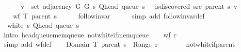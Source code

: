 \begin{isabellebody}
\ \ \ \ \ \ v\ {\isasymin}\ set\ {\isacharparenleft}{\kern0pt}adjacency\ G{}\ G{}\ s\ {\isacharparenleft}{\kern0pt}Q{\isacharunderscore}{\kern0pt}head\ {\isacharparenleft}{\kern0pt}queue\ s{\isacharparenright}{\kern0pt}{\isacharparenright}{\kern0pt}{\isacharparenright}{\kern0pt}\ {\isasymand}\ {\isasymnot}\ is{\isacharunderscore}{\kern0pt}discovered\ src\ {\isacharparenleft}{\kern0pt}parent\ s{\isacharparenright}{\kern0pt}\ v{\isacharbraceright}{\kern0pt}{\isachardoublequoteclose}\isanewline
\ \ \isamarkupfalse%
\ {\isachardoublequoteopen}wf\ {\isacharparenleft}{\kern0pt}T\ {\isacharparenleft}{\kern0pt}parent\ s{\isacharparenright}{\kern0pt}{\isacharparenright}{\kern0pt}{\isachardoublequoteclose}\isanewline
\ \ \ \ \isamarkupfalse%
\ follow{\isacharunderscore}{\kern0pt}invar\isanewline
\ \ \ \ \isamarkupfalse%
\ {\isacharparenleft}{\kern0pt}simp\ add{\isacharcolon}{\kern0pt}\ follow{\isacharunderscore}{\kern0pt}invar{\isacharunderscore}{\kern0pt}def{\isacharparenright}{\kern0pt}\isanewline
\ \ \isamarkupfalse%
\ {\isachardoublequoteopen}{\isasymnot}\ white\ s\ {\isacharparenleft}{\kern0pt}Q{\isacharunderscore}{\kern0pt}head\ {\isacharparenleft}{\kern0pt}queue\ s{\isacharparenright}{\kern0pt}{\isacharparenright}{\kern0pt}{\isachardoublequoteclose}\isanewline
\ \ \ \ \isamarkupfalse%
\ {\isacharparenleft}{\kern0pt}intro\ head{\isacharunderscore}{\kern0pt}queue{\isacharunderscore}{\kern0pt}mem{\isacharunderscore}{\kern0pt}queue\ not{\isacharunderscore}{\kern0pt}white{\isacharunderscore}{\kern0pt}if{\isacharunderscore}{\kern0pt}mem{\isacharunderscore}{\kern0pt}queue{\isacharparenright}{\kern0pt}\isanewline
\ \ \isamarkupfalse%
\ {\isachardoublequoteopen}wf\ {\isacharquery}{\kern0pt}r{\isachardoublequoteclose}\isanewline
\ \ \ \ \isamarkupfalse%
\ {\isacharparenleft}{\kern0pt}simp\ add{\isacharcolon}{\kern0pt}\ wf{\isacharunderscore}{\kern0pt}def{\isacharparenright}{\kern0pt}\isanewline
\ \ \isamarkupfalse%
\ {\isachardoublequoteopen}Domain\ {\isacharparenleft}{\kern0pt}T\ {\isacharparenleft}{\kern0pt}parent\ s{\isacharparenright}{\kern0pt}{\isacharparenright}{\kern0pt}\ {\isasyminter}\ Range\ {\isacharquery}{\kern0pt}r\ {\isacharequal}{\kern0pt}\ {\isacharbraceleft}{\kern0pt}{\isacharbraceright}{\kern0pt}{\isachardoublequoteclose}\isanewline
\ \ \ \ \isamarkupfalse%
\ not{\isacharunderscore}{\kern0pt}white{\isacharunderscore}{\kern0pt}if{\isacharunderscore}{\kern0pt}parent\isanewline
\ \ \ \ \isamarkupfalse%

\end{isabellebody}

